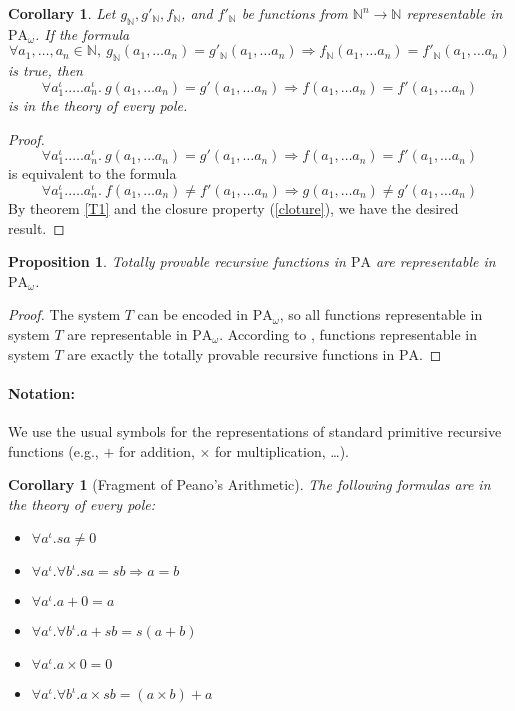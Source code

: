\documentclass[a4paper,12pt]{article}
\newtheorem{prop}[theo]{Proposition}
\newtheorem{coro}[theo]{Corollary}
\theoremstyle{rmqstyle}
\newcommand{\N}{\mathbb{N}}
\newcommand{\PA}{\mathrm{PA}}
\renewcommand{\implies}{\Rightarrow}
\begin{document}
\begin{coro}
\label{C1}
Let $g_\N, g'_\N, f_\N$, and  $f'_\N$ be functions from $\N^n \to \N$ representable in $\PA_\omega$. If the formula 
$$\forall a_1, \dots, a_n \in \N, \ g_\N (a_1, \dots a_n) = g'_\N (a_1, \dots a_n) \implies f_\N(a_1, \dots a_n) = f'_\N (a_1, \dots a_n)$$
is true, then 
$$\forall a_1^\iota. \dots. a_n^\iota. \ g(a_1, \dots a_n) = g'(a_1, \dots a_n) \implies  f(a_1, \dots a_n) = f'(a_1, \dots a_n)$$ 
is in the theory of every pole.
\end{coro}

\begin{proof}
$$\forall a_1^\iota. \dots. a_n^\iota. \ g(a_1, \dots a_n) = g'(a_1, \dots a_n) \implies  f(a_1, \dots a_n) = f'(a_1, \dots a_n)$$
is equivalent to the formula 
$$\forall a_1^\iota. \dots. a_n^\iota. \ f(a_1, \dots a_n) \neq f'(a_1, \dots a_n) \implies  g(a_1, \dots a_n) \neq g'(a_1, \dots a_n)$$
By theorem \ref{T1} and the closure property (\ref{cloture}), we have the desired result.
\end{proof}

\begin{prop}
Totally provable recursive functions in $\PA$ are representable in $\PA_\omega$.
\end{prop}

\begin{proof}
The system $T$ can be encoded in $\PA_\omega$, so all functions representable in system $T$ are representable in $\PA_\omega$. According to \cite{MiquelF}, functions representable in system $T$ are exactly the totally provable recursive functions in $\PA$.
\end{proof}

\paragraph{Notation:} We use the usual symbols for the representations of standard primitive recursive functions (e.g., $+$ for addition, $\times$ for multiplication, \dots).

\begin{coro}[Fragment of Peano's Arithmetic]
The following formulas are in the theory of every pole:
\begin{itemize}
\setlength\itemsep{ -1 em}
\item $\forall a^\iota. sa \neq 0$\\
\item $\forall a^\iota. \forall b^\iota. sa = sb \implies a = b$\\
\item $\forall a^\iota. a + 0 = a$\\
\item $\forall a^\iota. \forall b^\iota. a + sb = s(a + b)$\\
\item $\forall a^\iota. a \times 0 = 0$\\
\item $\forall a^\iota. \forall b^\iota. a \times sb = (a \times b) + a$
\end{itemize}
\end{coro}
\end{document}
